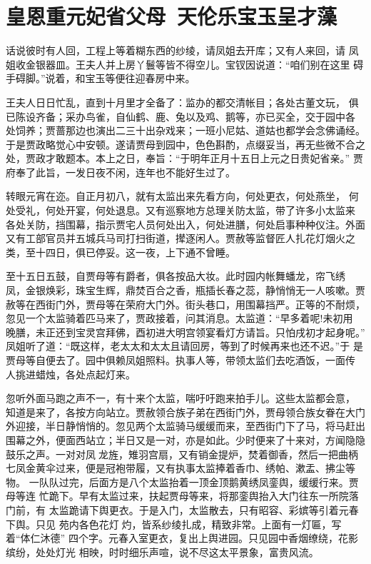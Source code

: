 \chapter{皇恩重元妃省父母~天伦乐宝玉呈才藻}

话说彼时有人回，工程上等着糊东西的纱绫，请凤姐去开库；又有人来回，请
凤姐收金银器皿。王夫人并上房丫鬟等皆不得空儿。宝钗因说道：“咱们别在这里
碍手碍脚。”说着，和宝玉等便往迎春房中来。

王夫人日日忙乱，直到十月里才全备了：监办的都交清帐目；各处古董文玩，
俱已陈设齐备；采办鸟雀，自仙鹤、鹿、兔以及鸡、鹅等，亦已买全，交于园中各
处饲养；贾蔷那边也演出二三十出杂戏来；一班小尼姑、道姑也都学会念佛诵经。
于是贾政略觉心中安顿。遂请贾母到园中，色色斟酌，点缀妥当，再无些微不合之
处，贾政才敢题本。本上之日，奉旨：“于明年正月十五日上元之日贵妃省亲。”
贾府奉了此旨，一发日夜不闲，连年也不能好生过了。

转眼元宵在迩。自正月初八，就有太监出来先看方向，何处更衣，何处燕坐，
何处受礼，何处开宴，何处退息。又有巡察地方总理关防太监，带了许多小太监来
各处关防，挡围幕，指示贾宅人员何处出入，何处进膳，何处启事种种仪注。外面
又有工部官员并五城兵马司打扫街道，撵逐闲人。贾赦等监督匠人扎花灯烟火之
类，至十四日，俱已停妥。这一夜，上下通不曾睡。

至十五日五鼓，自贾母等有爵者，俱各按品大妆。此时园内帐舞蟠龙，帘飞绣
凤，金银焕彩，珠宝生辉，鼎焚百合之香，瓶插长春之蕊，静悄悄无一人咳嗽。贾
赦等在西街门外，贾母等在荣府大门外。街头巷口，用围幕挡严。正等的不耐烦，
忽见一个太监骑着匹马来了，贾政接着，问其消息。太监道：“早多着呢!未初用
晚膳，未正还到宝灵宫拜佛，酉初进大明宫领宴看灯方请旨。只怕戌初才起身呢。”
凤姐听了道：“既这样，老太太和太太且请回房，等到了时候再来也还不迟。”于
是贾母等自便去了。园中俱赖凤姐照料。执事人等，带领太监们去吃酒饭，一面传
人挑进蜡烛，各处点起灯来。

忽听外面马跑之声不一，有十来个太监，喘吁吁跑来拍手儿。这些太监都会意，
知道是来了，各按方向站立。贾赦领合族子弟在西街门外，贾母领合族女眷在大门
外迎接，半日静悄悄的。忽见两个太监骑马缓缓而来，至西街门下了马，将马赶出
围幕之外，便面西站立；半日又是一对，亦是如此。少时便来了十来对，方闻隐隐
鼓乐之声。一对对凤龙旌，雉羽宫扇，又有销金提炉，焚着御香，然后一把曲柄
七凤金黄伞过来，便是冠袍带履，又有执事太监捧着香巾、绣帕、漱盂、拂尘等物。
一队队过完，后面方是八个太监抬着一顶金顶鹅黄绣凤銮舆，缓缓行来。贾母等连
忙跪下。早有太监过来，扶起贾母等来，将那銮舆抬入大门往东一所院落门前，有
太监跪请下舆更衣。于是入门，太监散去，只有昭容、彩嫔等引着元春下舆。只见
苑内各色花灯灼，皆系纱绫扎成，精致非常。上面有一灯匾，写着“体仁沐德”
四个字。元春入室更衣，复出上舆进园。只见园中香烟缭绕，花影缤纷，处处灯光
相映，时时细乐声喧，说不尽这太平景象，富贵风流。

